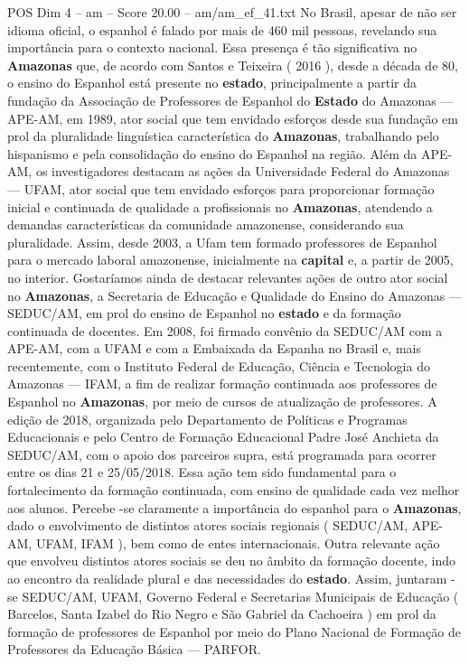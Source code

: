 \begin{textsample}{POS Dim 4 – am – Score 20.00 – am/am\_ef\_41.txt}
No Brasil, apesar de não ser idioma oficial, o espanhol é falado por mais de 460 mil pessoas, revelando sua importância para o contexto nacional.
Essa presença é tão significativa no \textbf{Amazonas} que, de acordo com Santos e Teixeira ( 2016 ), desde a década de 80, o ensino do Espanhol está presente no \textbf{estado}, principalmente a partir da fundação da Associação de Professores de Espanhol do \textbf{Estado} do Amazonas — APE-AM, em 1989, ator social que tem envidado esforços desde sua fundação em prol da pluralidade linguística característica do \textbf{Amazonas}, trabalhando pelo hispanismo e pela consolidação do ensino do Espanhol na região.
Além da APE-AM, os investigadores destacam as ações da Universidade Federal do Amazonas — UFAM, ator social que tem envidado esforços para proporcionar formação inicial e continuada de qualidade a profissionais no \textbf{Amazonas}, atendendo a demandas características da comunidade amazonense, considerando sua pluralidade.
Assim, desde 2003, a Ufam tem formado professores de Espanhol para o mercado laboral amazonense, inicialmente na \textbf{capital} e, a partir de 2005, no interior.
Gostaríamos ainda de destacar relevantes ações de outro ator social no \textbf{Amazonas}, a Secretaria de Educação e Qualidade do Ensino do Amazonas — SEDUC/AM, em prol do ensino de Espanhol no \textbf{estado} e da formação continuada de docentes.
Em 2008, foi firmado convênio da SEDUC/AM com a APE-AM, com a UFAM e com a Embaixada da Espanha no Brasil e, mais recentemente, com o Instituto Federal de Educação, Ciência e Tecnologia do Amazonas — IFAM, a fim de realizar formação continuada aos professores de Espanhol no \textbf{Amazonas}, por meio de cursos de atualização de professores.
A edição de 2018, organizada pelo Departamento de Políticas e Programas Educacionais e pelo Centro de Formação Educacional Padre José Anchieta da SEDUC/AM, com o apoio dos parceiros supra, está programada para ocorrer entre os dias 21 e 25/05/2018.
Essa ação tem sido fundamental para o fortalecimento da formação continuada, com ensino de qualidade cada vez melhor aos alunos.
Percebe -se claramente a importância do espanhol para o \textbf{Amazonas}, dado o envolvimento de distintos atores sociais regionais ( SEDUC/AM, APE-AM, UFAM, IFAM ), bem como de entes internacionais.
Outra relevante ação que envolveu distintos atores sociais se deu no âmbito da formação docente, indo ao encontro da realidade plural e das necessidades do \textbf{estado}.
Assim, juntaram -se SEDUC/AM, UFAM, Governo Federal e Secretarias Municipais de Educação ( Barcelos, Santa Izabel do Rio Negro e São Gabriel da Cachoeira ) em prol da formação de professores de Espanhol por meio do Plano Nacional de Formação de Professores da Educação Básica — PARFOR.

\end{textsample}
